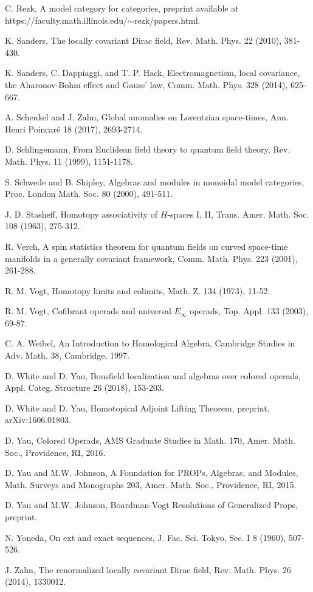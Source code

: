 \documentclass[11pt]{amsbook}
\numberwithin{section}{chapter}
\numberwithin{subsection}{section}
\numberwithin{equation}{section}
\theoremstyle{plain}
\theoremstyle{definition}
\begin{document}
\begin{thebibliography}{AAAAAA}
C. Rezk, A model category for categories, preprint available at https://faculty.math.illinois.edu/$\sim$rezk/papers.html.

K. Sanders, The locally covariant Dirac field, Rev. Math. Phys. 22 (2010), 381-430.

K. Sanders, C. Dappiaggi, and T. P. Hack, Electromagnetism, local covariance,
the Aharonov-Bohm effect and Gauss' law, Comm. Math. Phys. 328 (2014), 625-667.

A. Schenkel and J. Zahn, Global anomalies on Lorentzian space-times, Ann. Henri Poincar\'{e} 18 (2017), 2693-2714. 

D. Schlingemann, From Euclidean field theory to quantum field theory, Rev. Math. Phys. 11 (1999), 1151-1178.

S. Schwede and B. Shipley, Algebras and modules in monoidal model categories, Proc. London Math. Soc. 80 (2000), 491-511.

J. D. Stasheff, Homotopy associativity of $H$-spaces I, II, Trans. Amer. Math. Soc. 108 (1963), 275-312.

R. Verch, A spin statistics theorem for quantum fields on curved space-time manifolds in a generally covariant framework,  Comm. Math. Phys. 223 (2001), 261-288.

R. M. Vogt, Homotopy limits and colimits, Math. Z. 134 (1973), 11-52.

R. M. Vogt, Cofibrant operads and universal $E_{\infty}$ operads, Top. Appl. 133 (2003), 69-87.

C. A. Weibel, An Introduction to Homological Algebra, Cambridge Studies in Adv. Math. 38, Cambridge, 1997.

D. White and D. Yau, Bousfield localization and algebras over colored operads, Appl. Categ. Structure 26 (2018), 153-203.

D. White and D. Yau, Homotopical Adjoint Lifting Theorem, preprint, arXiv:1606.01803.

D. Yau, Colored Operads, AMS Graduate Studies in Math. 170, Amer. Math. Soc., Providence, RI, 2016.

D. Yau and M.W. Johnson, A Foundation for PROPs, Algebras, and Modules, Math. Surveys and Monographs 203, Amer. Math. Soc., Providence, RI, 2015.

D. Yau and M.W. Johnson, Boardman-Vogt Resolutions of Generalized Props, preprint.

N. Yoneda, On ext and exact sequences, J. Fac. Sci. Tokyo, Sec. I 8 (1960), 507-526.

J. Zahn, The renormalized locally covariant Dirac field, Rev. Math. Phys. 26 (2014), 1330012.

\end{thebibliography}


\printindex
\end{document}
